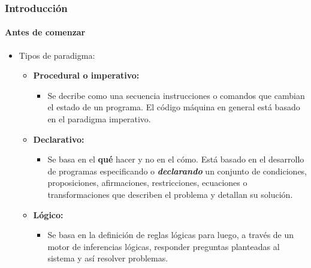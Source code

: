 \documentclass{beamer}
\begin{document}
		\begin{frame}
			\frametitle{Introducci\'on}
			\framesubtitle{Antes de comenzar}

			\begin{itemize}
  				\item Tipos de paradigma:
				\begin{itemize}
  					\item \textbf{Procedural o imperativo:}
					\begin{itemize}
  						\item Se decribe como una secuencia instrucciones o comandos que cambian el estado de un programa. El c\'odigo m\'aquina en general est\'a basado en el paradigma imperativo.
					\end{itemize}
					\item \textbf{Declarativo:}
					\begin{itemize}
  						\item Se basa en el \textbf{qu\'e} hacer y no en el c\'omo. Est\'a basado en el desarrollo de programas especificando o \textbf{{\em declarando}} un conjunto de condiciones, proposiciones, afirmaciones, restricciones, ecuaciones o transformaciones que describen el problema y detallan su soluci\'on.
					\end{itemize}
					\item \textbf{L\'ogico:}
					\begin{itemize}
  						\item Se basa en la definici\'on de reglas l\'ogicas para luego, a trav\'es de un motor de inferencias l\'ogicas, responder preguntas planteadas al sistema y as\'i resolver problemas.
					\end{itemize}
				\end{itemize}
			\end{itemize}
		\end{frame}
\end{document}
